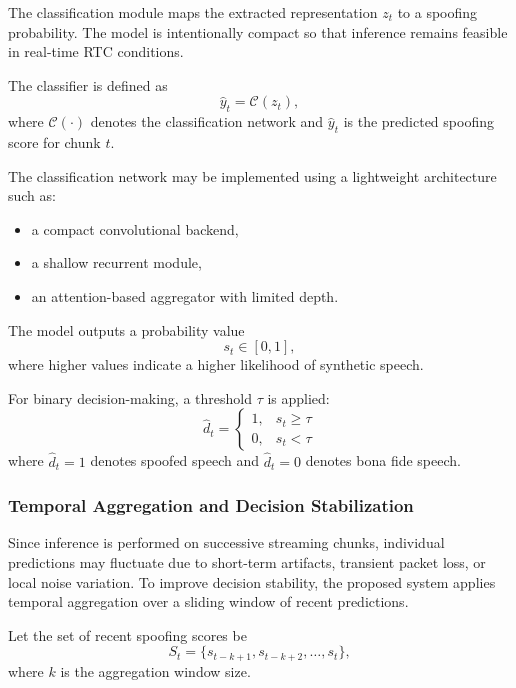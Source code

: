 The classification module maps the extracted representation \(z_t\) to a spoofing probability. The model is intentionally compact so that inference remains feasible in real-time RTC conditions.

The classifier is defined as
\begin{equation}
\hat{y}_t = \mathcal{C}(z_t),
\end{equation}
where \(\mathcal{C}(\cdot)\) denotes the classification network and \(\hat{y}_t\) is the predicted spoofing score for chunk \(t\).

The classification network may be implemented using a lightweight architecture such as:
\begin{itemize}
    \item a compact convolutional backend,
    \item a shallow recurrent module,
    \item an attention-based aggregator with limited depth.
\end{itemize}

The model outputs a probability value
\begin{equation}
s_t \in [0,1],
\end{equation}
where higher values indicate a higher likelihood of synthetic speech.

For binary decision-making, a threshold \(\tau\) is applied:
\begin{equation}
\hat{d}_t =
\begin{cases}
1, & s_t \geq \tau \\
0, & s_t < \tau
\end{cases}
\end{equation}
where \(\hat{d}_t = 1\) denotes spoofed speech and \(\hat{d}_t = 0\) denotes bona fide speech.

\subsubsection{Temporal Aggregation and Decision Stabilization}

Since inference is performed on successive streaming chunks, individual predictions may fluctuate due to short-term artifacts, transient packet loss, or local noise variation. To improve decision stability, the proposed system applies temporal aggregation over a sliding window of recent predictions.

Let the set of recent spoofing scores be
\begin{equation}
S_t = \{s_{t-k+1}, s_{t-k+2}, \ldots, s_t\},
\end{equation}
where \(k\) is the aggregation window size.

